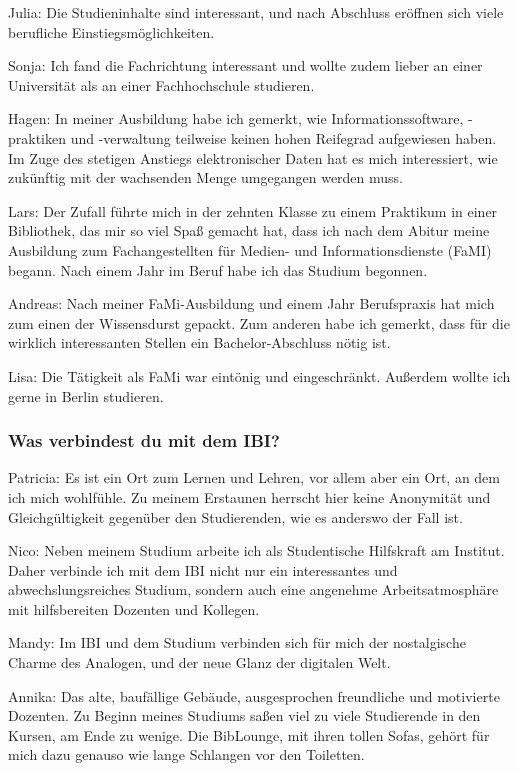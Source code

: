 \documentclass[a4paper,
fontsize=11pt,
oneside,
numbers=noperiodatend,
parskip=half-,
bibliography=totoc,
final
]{scrartcl}
\begin{document}
Julia: Die Studieninhalte sind interessant, und nach Abschluss eröffnen
sich viele berufliche Einstiegsmöglichkeiten.

Sonja: Ich fand die Fachrichtung interessant und wollte zudem lieber an
einer Universität als an einer Fachhochschule studieren.

Hagen: In meiner Ausbildung habe ich gemerkt, wie Informationssoftware,
-praktiken und \mbox{-verwaltung} teilweise keinen hohen Reifegrad aufgewiesen
haben. Im Zuge des stetigen Anstiegs elektronischer Daten hat es mich
interessiert, wie zukünftig mit der wachsenden Menge umgegangen werden
muss.

Lars: Der Zufall führte mich in der zehnten Klasse zu einem Praktikum in
einer Bibliothek, das mir so viel Spaß gemacht hat, dass ich nach dem
Abitur meine Ausbildung zum Fachangestellten für Medien- und
Informationsdienste (FaMI) begann. Nach einem Jahr im Beruf habe ich das
Studium begonnen.

Andreas: Nach meiner FaMi-Ausbildung und einem Jahr Berufspraxis hat
mich zum einen der Wissensdurst gepackt. Zum anderen habe ich gemerkt,
dass für die wirklich interessanten Stellen ein Bachelor-Abschluss nötig
ist.

Lisa: Die Tätigkeit als FaMi war eintönig und eingeschränkt. Außerdem
wollte ich gerne in Berlin studieren.

\hypertarget{was-verbindest-du-mit-dem-ibi}{%
\subsubsection{Was verbindest du mit dem
IBI?}\label{was-verbindest-du-mit-dem-ibi}}

Patricia: Es ist ein Ort zum Lernen und Lehren, vor allem aber ein Ort,
an dem ich mich wohlfühle. Zu meinem Erstaunen herrscht hier keine
Anonymität und Gleichgültigkeit gegenüber den Studierenden, wie es
anderswo der Fall ist.

Nico: Neben meinem Studium arbeite ich als Studentische Hilfskraft am
Institut. Daher verbinde ich mit dem IBI nicht nur ein interessantes und
abwechslungsreiches Studium, sondern auch eine angenehme
Arbeitsatmosphäre mit hilfsbereiten Dozenten und Kollegen.

Mandy: Im IBI und dem Studium verbinden sich für mich der nostalgische
Charme des Analogen, und der neue Glanz der digitalen Welt.

Annika: Das alte, baufällige Gebäude, ausgesprochen freundliche und
motivierte Dozenten. Zu Beginn meines Studiums saßen viel zu viele
Studierende in den Kursen, am Ende zu wenige. Die BibLounge, mit ihren
tollen Sofas, gehört für mich dazu genauso wie lange Schlangen vor den
Toiletten.
\end{document}
